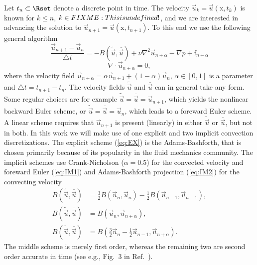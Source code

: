Let $t_n \subset \Rset$ denote a discrete point in time. The velocity
$\vec{u}_k=\vec{u}(\text{x},t_k)$ is known for $k\le n$,
$k \in FIXME: This is undefined!$, and we are interested in advancing the solution to
$\vec{u}_{n+1}=\vec{u}(\text{x},t_{n+1})$. To this end we use the
following general algorithm
\begin{equation}
\label{eq:NS_d} \frac{\vec{u}_{n+1}-\vec{u}_{n}}{\triangle t} = - B(\tilde{\vec{u}},\overline{\vec{u}}) + \nu \nabla^2 \vec{u}_{n+\alpha} -\nabla p + \text{f}_{n+\alpha}
\end{equation}
\begin{equation}
 \label{eq:cont_d} \nabla \cdot \vec{u}_{n+\alpha} =0,
\end{equation}
where the velocity field $\vec{u}_{n+\alpha}=\alpha \vec{u}_{n+1} +
(1-\alpha) \vec{u}_{n}$, $\alpha \in [0,1]$ is a parameter and
$\triangle t = t_{n+1}-t_n$. The velocity fields $\tilde{\vec{u}}$ and
$\overline{\vec{u}}$ can in general take any form. Some regular
choices are for example
$\tilde{\vec{u}}=\overline{\vec{u}}=\vec{u}_{n+1}$, which yields the
nonlinear backward Euler scheme, or $\tilde{\vec{u}}
= \overline{\vec{u}} = \vec{u}_{n}$, which leads to a foreward Euler
scheme. A linear scheme requires that $\vec{u}_{n+1}$ is present
(linearly) in either $\tilde{\vec{u}}$ or $\overline{\vec{u}}$, but
not in both. In this work we will make use of one explicit and two
implicit convection discretizations. The explicit scheme (\ref{eq:EX})
is the Adams-Bashforth, that is chosen primarily because of its
popularity in the fluid mechanics community. The implicit schemes use
Crank-Nicholson ($\alpha=0.5$) for the convected velocity and foreward
Euler (\ref{eq:IM1}) and Adams-Bashforth projection (\ref{eq:IM2}) for
the convecting velocity
\begin{align}
\label{eq:EX} B(\tilde{\vec{u}},\overline{\vec{u}}) &=\frac{3}{2}B(\vec{u}_n,\vec{u}_n)-\frac{1}{2}B(\vec{u}_{n-1},\vec{u}_{n-1}), \\
\label{eq:IM1} B(\tilde{\vec{u}},\overline{\vec{u}}) &=B(\vec{u}_{n},\vec{u}_{n+\alpha}), \\
 \label{eq:IM2} B(\tilde{\vec{u}},\overline{\vec{u}}) &=B(\frac{3}{2}\vec{u}_{n}-\frac{1}{2}\vec{u}_{n-1},\vec{u}_{n+\alpha}).
\end{align}
The middle scheme is merely first order, whereas the remaining two are
second order accurate in time (see e.g., Fig.~3 in
Ref.~\cite{simo94}).

